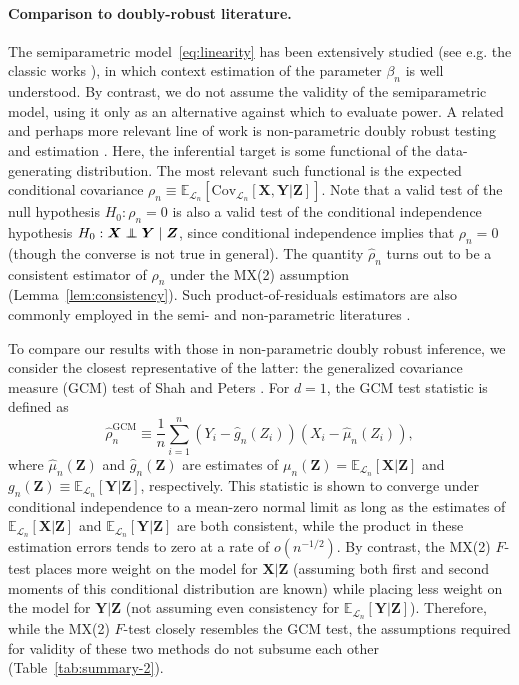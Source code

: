 \documentclass[12pt]{article}
\theoremstyle{definition}
\theoremstyle{remark}
\def\independenT#1#2{\mathrel{\rlap{$#1#2$}\mkern2mu{#1#2}}}
\newcommand\independent{\protect\mathpalette{\protect\independenT}{\perp}}
\newcommand{\prx}{\bm X}
\newcommand{\srx}{X}
\newcommand{\prz}{\bm Z}
\newcommand{\srz}{Z}
\newcommand{\pry}{{\bm Y}}
\newcommand{\sry}{Y}
\begin{document}
\paragraph{Comparison to doubly-robust literature.}

The semiparametric model~\eqref{eq:linearity} has been extensively studied (see e.g. the classic works \cite{Robinson1988, Robins1992}), in which context estimation of the parameter $\beta_n$ is well understood. By contrast, we do not assume the validity of the semiparametric model, using it only as an alternative against which to evaluate power. A related and perhaps more relevant line of work is non-parametric doubly robust testing \cite{Shah2018, Dukes2020}  and estimation \cite{VanderLaan2011, Chernozhukov2018}. Here, the inferential target is some functional of the data-generating distribution. The most relevant such functional is the expected conditional covariance $\rho_n \equiv \mathbb E_{\mathcal L_n}[\text{Cov}_{\mathcal L_n}[\prx, \pry|\prz]]$. Note that a valid test of the null hypothesis $H_0: \rho_n = 0$ is also a valid test of the conditional independence hypothesis $H_0: \prx \independent \pry \mid \prz$, since conditional independence implies that $\rho_n = 0$ (though the converse is not true in general). The quantity $\widehat \rho_n$ turns out to be a consistent estimator of $\rho_n$ under the MX(2) assumption (Lemma~\ref{lem:consistency}). Such product-of-residuals estimators are also commonly employed in the semi- and non-parametric literatures \cite{Robinson1988, Robins1992, Li2011}.

To compare our results with those in non-parametric doubly robust inference, we consider the closest representative of the latter: the generalized covariance measure (GCM) test of Shah and Peters \cite{Shah2018}. For $d = 1$, the GCM test statistic is defined as
\begin{equation}
	\widehat \rho^{\text{GCM}}_n \equiv \frac{1}{n}\sum_{i = 1}^n  (\sry_i - \widehat g_n(\srz_i))(\srx_i - \widehat \mu_n(\srz_i)),
\end{equation}
where $\widehat \mu_n(\prz)$ and $\widehat g_n(\prz)$ are estimates of $\mu_n(\prz) = \mathbb E_{\mathcal L_n}[\prx|\prz]$ and $g_n(\prz) \equiv \mathbb E_{\mathcal L_n}[\pry|\prz]$, respectively. This statistic is shown to converge under conditional independence to a mean-zero normal limit as long as the estimates of $\mathbb E_{\mathcal L_n}[\prx|\prz]$ and $\mathbb E_{\mathcal L_n}[\pry|\prz]$ are both consistent, while the product in these estimation errors tends to zero at a rate of $o(n^{-1/2})$. By contrast, the MX(2) $F$-test places more weight on the model for $\prx|\prz$ (assuming both first and second moments of this conditional distribution are known) while placing less weight on the model for $\pry|\prz$ (not assuming even consistency for $\mathbb E_{\mathcal L_n}[\pry|\prz]$). Therefore, while the MX(2) $F$-test closely resembles the GCM test, the assumptions required for validity of these two methods do not subsume each other (Table~\ref{tab:summary-2}). 
\end{document}
